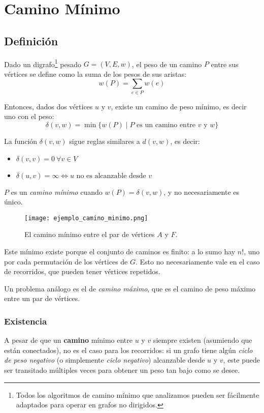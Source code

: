 \chapter{Camino Mínimo}

\section{Definición}

Dado un digrafo\footnote{Todos los algoritmos de camino mínimo que analizamos pueden ser fácilmente adaptados para operar en grafos no dirigidos.} pesado $G = (V, E, w)$, el peso de un camino $P$ entre sus vértices se define como la suma de los pesos de sus aristas:
$$w(P) = \sum_{e \in P} w(e)$$

Entonces, dados dos vértices $u$ y $v$, existe un camino de peso mínimo, es decir uno con el peso:
$$\delta(v, w) = \min{\{w(P) \mid P \text{ es un camino entre $v$ y $w$}\}}$$

La función $\delta(v, w)$ sigue reglas similares a $d(v, w)$, es decir:
\begin{itemize}
    \item $\delta(v, v) = 0\ \forall v \in V$
    \item $\delta(u, v) = \infty \iff \text{$u$ no es alcanzable desde $v$}$
\end{itemize}

$P$ es un \textit{camino mínimo} cuando $w(P) = \delta(v, w)$, y no necesariamente es único.

\begin{figure}[H]
    \centering
    \texttt{[image: ejemplo\_camino\_minimo.png]}
    \caption*{El camino mínimo entre el par de vértices $A$ y $F$.}
\end{figure}

Este mínimo existe porque el conjunto de caminos es finito: a lo sumo hay $n!$, uno por cada permutación de los vértices de $G$. Esto no necesariamente vale en el caso de recorridos, que pueden tener vértices repetidos.

Un problema análogo es el de \textit{camino máximo}, que es el camino de peso máximo entre un par de vértices.

\subsection{Existencia}

A pesar de que un \textbf{camino} mínimo entre $u$ y $v$ siempre existen (asumiendo que están conectados), no es el caso para los recorridos: si un grafo tiene algún \textit{ciclo de peso negativo} (o simplemente \textit{ciclo negativo}) alcanzable desde $u$ y $v$, este puede ser transitado múltiples veces para obtener un peso tan bajo como se desee.

